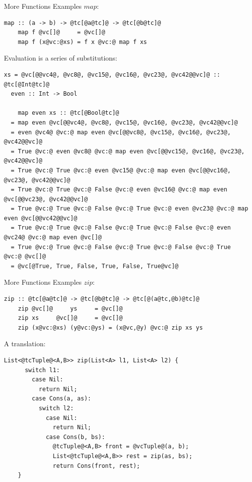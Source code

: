 \documentclass[xcolor={usenames,dvipsnames}]{beamer}
\begin{document}
\begin{frame}[fragile]{More Functions Examples}
  $map$:
  \begin{lstlisting}[style=hask]
    map :: (a -> b) -> @tc[@a@tc]@ -> @tc[@b@tc]@
    map f @vc[]@     = @vc[]@
    map f (x@vc:@xs) = f x @vc:@ map f xs
  \end{lstlisting}

  Evaluation is a series of substitutions:
  \begin{lstlisting}[style=hask]
  xs = @vc[@@vc4@, @vc8@, @vc15@, @vc16@, @vc23@, @vc42@@vc]@ :: @tc[@Int@tc]@
  even :: Int -> Bool

    map even xs :: @tc[@Bool@tc]@
  = map even @vc[@@vc4@, @vc8@, @vc15@, @vc16@, @vc23@, @vc42@@vc]@
  = even @vc4@ @vc:@ map even @vc[@@vc8@, @vc15@, @vc16@, @vc23@, @vc42@@vc]@
  = True @vc:@ even @vc8@ @vc:@ map even @vc[@@vc15@, @vc16@, @vc23@, @vc42@@vc]@
  = True @vc:@ True @vc:@ even @vc15@ @vc:@ map even @vc[@@vc16@, @vc23@, @vc42@@vc]@
  = True @vc:@ True @vc:@ False @vc:@ even @vc16@ @vc:@ map even @vc[@@vc23@, @vc42@@vc]@
  = True @vc:@ True @vc:@ False @vc:@ True @vc:@ even @vc23@ @vc:@ map even @vc[@@vc42@@vc]@
  = True @vc:@ True @vc:@ False @vc:@ True @vc:@ False @vc:@ even @vc24@ @vc:@ map even @vc[]@
  = True @vc:@ True @vc:@ False @vc:@ True @vc:@ False @vc:@ True @vc:@ @vc[]@
  = @vc[@True, True, False, True, False, True@vc]@

  \end{lstlisting}
\end{frame}

\begin{frame}[fragile]{More Functions Examples}
  $zip$:
  \begin{lstlisting}[style=hask]
    zip :: @tc[@a@tc]@ -> @tc[@b@tc]@ -> @tc[@(a@tc,@b)@tc]@
    zip @vc[]@     ys     = @vc[]@
    zip xs     @vc[]@     = @vc[]@
    zip (x@vc:@xs) (y@vc:@ys) = (x@vc,@y) @vc:@ zip xs ys
  \end{lstlisting}

  \pause
  A translation:
  \begin{lstlisting}[style=hask]
    List<@tcTuple@<A,B>> zip(List<A> l1, List<A> l2) {
      switch l1:
        case Nil:
          return Nil;
        case Cons(a, as):
          switch l2:
            case Nil:
              return Nil;
            case Cons(b, bs):
              @tcTuple@<A,B> front = @vcTuple@(a, b);
              List<@tcTuple@<A,B>> rest = zip(as, bs);
              return Cons(front, rest);
    }
  \end{lstlisting}
\end{frame}
\end{document}
